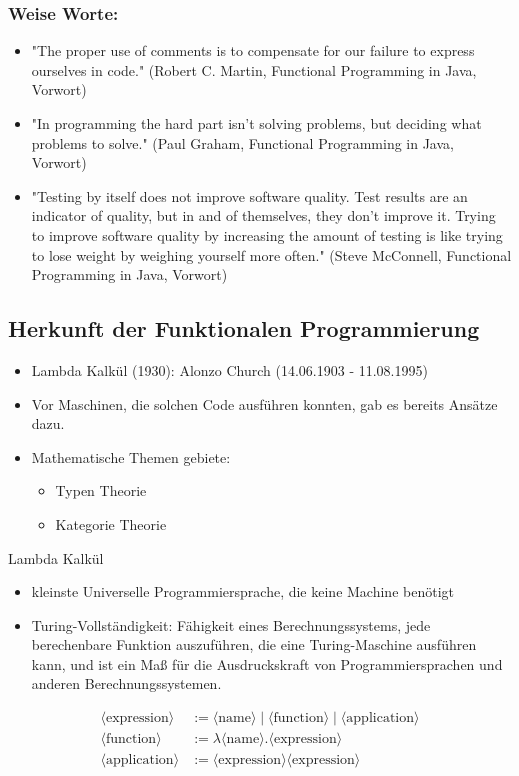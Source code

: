 \documentclass{beamer}
\begin{document}
\begin{frame}
\frametitle{Weise Worte:}
\begin{itemize}
\item \textmd{"The proper use of comments is to compensate for our failure to express ourselves in code." (Robert C. Martin, Functional Programming in Java, Vorwort)}
\item \textmd{"In programming the hard part isn’t solving problems, but deciding what problems to solve." (Paul Graham, Functional Programming in Java, Vorwort)}
\item \textmd{"Testing by itself does not improve software quality. Test results are an indicator of quality, but
in and of themselves, they don’t improve it. Trying to improve software quality by increasing
the amount of testing is like trying to lose weight by weighing yourself more often." (Steve McConnell, Functional Programming in Java, Vorwort)}
\end{itemize}
\end{frame}


\begin{frame}
	\section{Herkunft der Funktionalen Programmierung}
	\begin{itemize}
		\item Lambda Kalkül (1930):  Alonzo Church (14.06.1903 - 11.08.1995)
		\item Vor Maschinen, die solchen Code ausführen konnten, gab es bereits Ansätze dazu.
        \item Mathematische Themen gebiete: 
        \begin{itemize}
        	\item Typen Theorie
        	\item Kategorie Theorie
        \end{itemize} 
	\end{itemize}
\end{frame}

\begin{frame}{Lambda Kalkül }
		\begin{itemize}
				\item kleinste Universelle Programmiersprache, die keine Machine benötigt
				\item Turing-Vollständigkeit: Fähigkeit eines Berechnungssystems, jede berechenbare Funktion auszuführen, die eine Turing-Maschine ausführen kann, und ist ein Maß für die Ausdruckskraft von Programmiersprachen und anderen Berechnungssystemen.
		\end{itemize}
	\begin{align*}
		\langle \text{expression} \rangle & := \langle \text{name} \rangle \mid \langle \text{function} \rangle \mid \langle \text{application} \rangle \\
		\langle \text{function} \rangle & := \lambda \langle \text{name} \rangle . \langle \text{expression} \rangle \\
		\langle \text{application} \rangle & := \langle \text{expression} \rangle \langle \text{expression} \rangle
	\end{align*}
	\end{frame}
\end{document}
